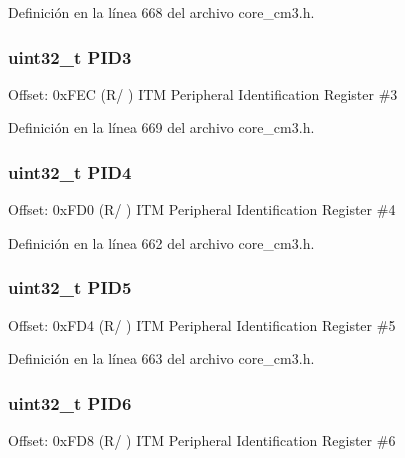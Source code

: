 Definición en la línea 668 del archivo core\+\_\+cm3.\+h.

\subsubsection[{\texorpdfstring{P\+I\+D3}{PID3}}]{ uint32\+\_\+t P\+I\+D3}\hypertarget{struct_i_t_m___type_a510fcf8ad6966fdfb0767e624b74c64f}{}\label{struct_i_t_m___type_a510fcf8ad6966fdfb0767e624b74c64f}
Offset\+: 0x\+F\+EC (R/ ) I\+TM Peripheral Identification Register \#3 

Definición en la línea 669 del archivo core\+\_\+cm3.\+h.

\subsubsection[{\texorpdfstring{P\+I\+D4}{PID4}}]{ uint32\+\_\+t P\+I\+D4}\hypertarget{struct_i_t_m___type_ad75960b83ea47a469e6a1406dd9eefa6}{}\label{struct_i_t_m___type_ad75960b83ea47a469e6a1406dd9eefa6}
Offset\+: 0x\+F\+D0 (R/ ) I\+TM Peripheral Identification Register \#4 

Definición en la línea 662 del archivo core\+\_\+cm3.\+h.

\subsubsection[{\texorpdfstring{P\+I\+D5}{PID5}}]{ uint32\+\_\+t P\+I\+D5}\hypertarget{struct_i_t_m___type_a7276a30c464f0b34944b6eb16d3df077}{}\label{struct_i_t_m___type_a7276a30c464f0b34944b6eb16d3df077}
Offset\+: 0x\+F\+D4 (R/ ) I\+TM Peripheral Identification Register \#5 

Definición en la línea 663 del archivo core\+\_\+cm3.\+h.

\subsubsection[{\texorpdfstring{P\+I\+D6}{PID6}}]{ uint32\+\_\+t P\+I\+D6}\hypertarget{struct_i_t_m___type_ae5d83564471b76d88088a949ca67ac9b}{}\label{struct_i_t_m___type_ae5d83564471b76d88088a949ca67ac9b}
Offset\+: 0x\+F\+D8 (R/ ) I\+TM Peripheral Identification Register \#6 

